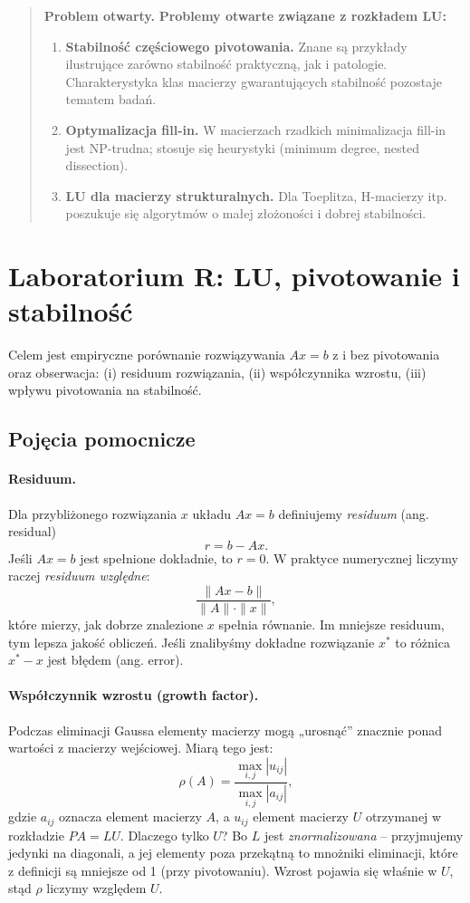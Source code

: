 \documentclass[12pt]{article}
\newenvironment{openproblem}{\begin{quote}\color{red}\textbf{Problem otwarty. }}{\end{quote}}
\begin{document}
\begin{openproblem}
\textbf{Problemy otwarte związane z rozkładem LU:}
\begin{enumerate}[label=\alph*)]
  \item \textbf{Stabilność częściowego pivotowania.}
  Znane są przykłady ilustrujące zarówno stabilność praktyczną, jak i patologie.
  Charakterystyka klas macierzy gwarantujących stabilność pozostaje tematem badań.
  \item \textbf{Optymalizacja fill-in.}
  W macierzach rzadkich minimalizacja fill-in jest NP-trudna; stosuje się heurystyki
  (minimum degree, nested dissection).
  \item \textbf{LU dla macierzy strukturalnych.}
  Dla Toeplitza, H-macierzy itp. poszukuje się algorytmów o małej złożoności i dobrej stabilności.
\end{enumerate}
\end{openproblem}

\section*{Laboratorium R: LU, pivotowanie i stabilność}

Celem jest empiryczne porównanie rozwiązywania $Ax=b$ z i bez pivotowania 
oraz obserwacja: (i) residuum rozwiązania, (ii) współczynnika wzrostu, 
(iii) wpływu pivotowania na stabilność.

\subsection*{Pojęcia pomocnicze}

\paragraph{Residuum.}
Dla przybliżonego rozwiązania $x$ układu $Ax=b$ definiujemy \emph{residuum} (ang. residual)
\[
r = b - A x.
\]
Jeśli $Ax=b$ jest spełnione dokładnie, to $r=0$. W praktyce numerycznej 
liczymy raczej \emph{residuum względne}:
\[
\frac{\|Ax-b\|}{\|A\|\cdot \|x\|},
\]
które mierzy, jak dobrze znalezione $x$ spełnia równanie. 
Im mniejsze residuum, tym lepsza jakość obliczeń. Jeśli znalibyśmy dokładne rozwiązanie $x^*$ to różnica $x^*-x$ jest błędem (ang. error).

\paragraph{Współczynnik wzrostu (growth factor).}
Podczas eliminacji Gaussa elementy macierzy mogą „urosnąć” 
znacznie ponad wartości z macierzy wejściowej. 
Miarą tego jest:
\[
\rho(A) = \frac{\max_{i,j} |u_{ij}|}{\max_{i,j} |a_{ij}|},
\]
gdzie $a_{ij}$ oznacza element macierzy $A$, a $u_{ij}$ element macierzy $U$
otrzymanej w rozkładzie $PA=LU$.  
Dlaczego tylko $U$? Bo $L$ jest \emph{znormalizowana} – przyjmujemy jedynki na diagonali, 
a jej elementy poza przekątną to mnożniki eliminacji, które z definicji są mniejsze od 1 
(przy pivotowaniu). Wzrost pojawia się właśnie w $U$, stąd $\rho$ liczymy względem $U$.
\end{document}

